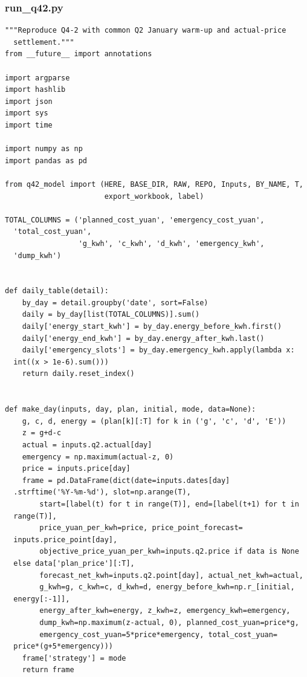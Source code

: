 \subsubsection*{run\_q42.py}
\begin{verbatim}
"""Reproduce Q4-2 with common Q2 January warm-up and actual-price
  settlement."""
from __future__ import annotations

import argparse
import hashlib
import json
import sys
import time

import numpy as np
import pandas as pd

from q42_model import (HERE, BASE_DIR, RAW, REPO, Inputs, BY_NAME, T,
                       export_workbook, label)

TOTAL_COLUMNS = ('planned_cost_yuan', 'emergency_cost_yuan',
  'total_cost_yuan',
                 'g_kwh', 'c_kwh', 'd_kwh', 'emergency_kwh',
  'dump_kwh')


def daily_table(detail):
    by_day = detail.groupby('date', sort=False)
    daily = by_day[list(TOTAL_COLUMNS)].sum()
    daily['energy_start_kwh'] = by_day.energy_before_kwh.first()
    daily['energy_end_kwh'] = by_day.energy_after_kwh.last()
    daily['emergency_slots'] = by_day.emergency_kwh.apply(lambda x:
  int((x > 1e-6).sum()))
    return daily.reset_index()


def make_day(inputs, day, plan, initial, mode, data=None):
    g, c, d, energy = (plan[k][:T] for k in ('g', 'c', 'd', 'E'))
    z = g+d-c
    actual = inputs.q2.actual[day]
    emergency = np.maximum(actual-z, 0)
    price = inputs.price[day]
    frame = pd.DataFrame(dict(date=inputs.dates[day]
  .strftime('%Y-%m-%d'), slot=np.arange(T),
        start=[label(t) for t in range(T)], end=[label(t+1) for t in
  range(T)],
        price_yuan_per_kwh=price, price_point_forecast=
  inputs.price_point[day],
        objective_price_yuan_per_kwh=inputs.q2.price if data is None
  else data['plan_price'][:T],
        forecast_net_kwh=inputs.q2.point[day], actual_net_kwh=actual,
        g_kwh=g, c_kwh=c, d_kwh=d, energy_before_kwh=np.r_[initial,
  energy[:-1]],
        energy_after_kwh=energy, z_kwh=z, emergency_kwh=emergency,
        dump_kwh=np.maximum(z-actual, 0), planned_cost_yuan=price*g,
        emergency_cost_yuan=5*price*emergency, total_cost_yuan=
  price*(g+5*emergency)))
    frame['strategy'] = mode
    return frame



\end{verbatim}
